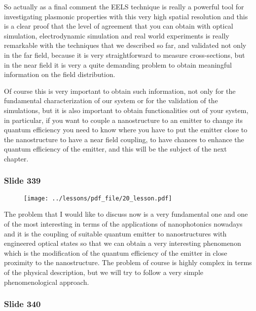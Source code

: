 \documentclass[../main/main.tex]{subfiles}
\begin{document}
So actually as a final comment the EELS technique is really a powerful tool for investigating plasmonic properties with this very high spatial resolution and this is a clear proof that the level of agreement that you can obtain with optical simulation, electrodynamic simulation and real world experiments is really remarkable with the techniques that we described so far, and validated not only in the far field, because it is very straightforward to measure cross-sections, but in the near field it is very a quite demanding problem to obtain meaningful information on the field distribution.

Of course this is very important to obtain such information, not only for the fundamental characterization of our system or for the validation of the simulations, but it is also important to obtain functionalities out of your system, in particular, if you want to couple a nanostructure to an emitter to change its quantum efficiency you need to know where you have to put the emitter close to the nanostructure to have a near field coupling, to have chances to enhance the quantum efficiency of the emitter, and this will be the subject of the next chapter.

\newpage

\subsubsection{Slide 339}

\begin{figure}[h!]
\centering
\texttt{[image: ../lessons/pdf\_file/20\_lesson.pdf]}
\end{figure}

The problem that I would like to discuss now is a very fundamental one and one of the most interesting in terms of the applications of nanophotonics nowadays and it is the coupling of suitable quantum emitter to nanostructures with engineered optical states so that we can obtain a very interesting phenomenon which is the modification of the quantum efficiency of the emitter in close proximity to the nanostructure. The problem of course is highly complex in terms of the physical description, but we will try to follow a very simple phenomenological approach. 

\newpage

\subsubsection{Slide 340}
\end{document}
